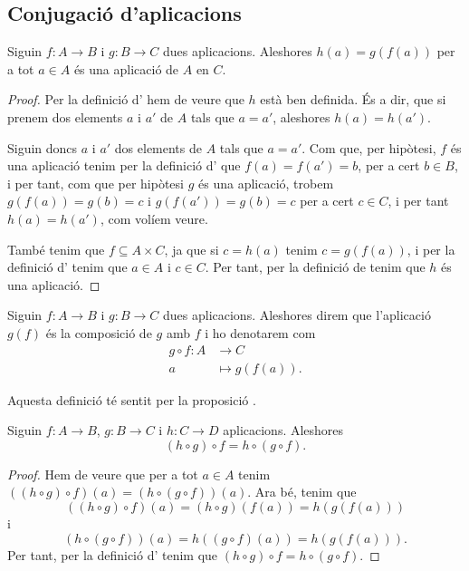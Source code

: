 \documentclass[../../Main.tex]{subfiles}
\begin{document}
	\subsection{Conjugació d'aplicacions}
	\begin{proposition}
		\label{prop:conjugació d'aplicacions}
		Siguin \(f\colon A\rightarrow B\) i \(g\colon B\rightarrow C\) dues aplicacions. Aleshores \(h(a)=g(f(a))\) per a tot \(a\in A\) és una aplicació de \(A\) en \(C\).
		\begin{proof}
			Per la definició d' hem de veure que \(h\) està ben definida. És a dir, que si prenem dos elements \(a\) i \(a'\) de \(A\) tals que \(a=a'\), aleshores \(h(a)=h(a')\).
			
			Siguin doncs \(a\) i \(a'\) dos elements de \(A\) tals que \(a=a'\). Com que, per hipòtesi, \(f\) és una aplicació tenim per la definició d' que \(f(a)=f(a')=b\), per a cert \(b\in B\), i per tant, com que per hipòtesi \(g\) és una aplicació, trobem \(g(f(a))=g(b)=c\) i \(g(f(a'))=g(b)=c\) per a cert \(c\in C\), i per tant \(h(a)=h(a')\), com volíem veure.
			
			També tenim que \(f\subseteq A\times C\), ja que si \(c=h(a)\) tenim \(c=g(f(a))\), i per la definició d' tenim que \(a\in A\) i \(c\in C\). Per tant, per la definició de  tenim que \(h\) és una aplicació.
		\end{proof}
	\end{proposition}
	\begin{definition}
		\label{def:conjugació d'aplicacions}
		Siguin \(f\colon A\rightarrow B\) i \(g\colon B\rightarrow C\) dues aplicacions. Aleshores direm que l'aplicació \(g(f)\) és la composició de \(g\) amb \(f\) i ho denotarem com
		\begin{align*}
		g\circ f\colon A&\longrightarrow C\\
		a&\longmapsto g(f(a)).
		\end{align*}
		
		Aquesta definició té sentit per la proposició \myref{prop:conjugació d'aplicacions}.
	\end{definition}
	\begin{proposition}
		\label{prop:associativitat de la conjugació de funcions}
		Siguin \(f\colon A\rightarrow B\), \(g\colon B\rightarrow C\) i \(h\colon C\rightarrow D\) aplicacions. Aleshores
		\[(h\circ g)\circ f=h\circ(g\circ f).\]
		\begin{proof}
			Hem de veure que per a tot \(a\in A\) tenim \(((h\circ g)\circ f)(a)=(h\circ(g\circ f))(a)\). Ara bé, tenim que
			\[((h\circ g)\circ f)(a)=(h\circ g)(f(a))=h(g(f(a)))\]
			i
			\[(h\circ(g\circ f))(a)=h((g\circ f)(a))=h(g(f(a))).\]
			Per tant, per la definició d' tenim que \((h\circ g)\circ f=h\circ(g\circ f)\).
		\end{proof}
	\end{proposition}
\end{document}
